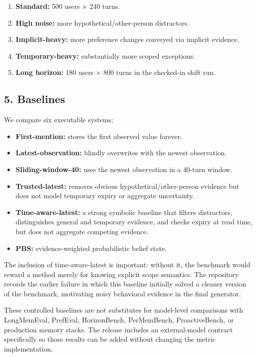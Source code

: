\documentclass[
  10pt,
  letterpaper,
]{article}
\providecommand{\tightlist}{%
  \setlength{\itemsep}{0pt}\setlength{\parskip}{0pt}}
\begin{document}
\begin{enumerate}
\def\labelenumi{\arabic{enumi}.}
\tightlist
\item
  \textbf{Standard:} 500 users × 240 turns.
\item
  \textbf{High noise:} more hypothetical/other-person distractors.
\item
  \textbf{Implicit-heavy:} more preference changes conveyed via implicit
  evidence.
\item
  \textbf{Temporary-heavy:} substantially more scoped exceptions.
\item
  \textbf{Long horizon:} 180 users × 800 turns in the checked-in shift
  run.
\end{enumerate}

\subsection{5. Baselines}\label{baselines}

We compare six executable systems:

\begin{itemize}
\tightlist
\item
  \textbf{First-mention:} stores the first observed value forever.
\item
  \textbf{Latest-observation:} blindly overwrites with the newest
  observation.
\item
  \textbf{Sliding-window-40:} uses the newest observation in a 40-turn
  window.
\item
  \textbf{Trusted-latest:} removes obvious hypothetical/other-person
  evidence but does not model temporary expiry or aggregate uncertainty.
\item
  \textbf{Time-aware-latest:} a strong symbolic baseline that filters
  distractors, distinguishes general and temporary evidence, and checks
  expiry at read time, but does not aggregate competing evidence.
\item
  \textbf{PBS:} evidence-weighted probabilistic belief state.
\end{itemize}

The inclusion of time-aware-latest is important: without it, the
benchmark would reward a method merely for knowing explicit scope
semantics. The repository records the earlier failure in which this
baseline initially solved a cleaner version of the benchmark, motivating
noisy behavioral evidence in the final generator.

These controlled baselines are not substitutes for model-level
comparisons with LongMemEval, PrefEval, HorizonBench, PerMemBench,
ProactiveBench, or production memory stacks. The release includes an
external-model contract specifically so those results can be added
without changing the metric implementation.
\end{document}
